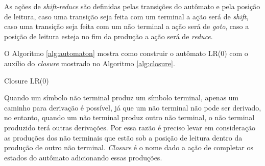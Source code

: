 As ações de \textit{shift-reduce} são definidas pelas transições do autômato e pela posição de leitura, caso uma transição seja feita com um terminal a ação será de \textit{shift}, caso uma transição seja feita com um não terminal a ação será de \textit{goto}, caso a posição de leitura esteja no fim da produção a ação será de \textit{reduce}.

O Algoritmo \ref{alg:automaton} mostra como construir o autômato LR(0) com o auxílio do \textit{closure} mostrado no Algoritmo \ref{alg:closure}.

\begin{algorithm}[ht]
    \caption{Closure LR(0)}\label{alg:closure}
\end{algorithm}

Quando um símbolo não terminal produz um símbolo terminal, apenas um caminho para derivação é possível, já que um não terminal não pode ser derivado, no entanto, quando um não terminal produz outro não terminal, o não terminal produzido terá outras derivações. Por essa razão é preciso levar em consideração as produções dos não terminais que estão sob a posição de leitura dentro da produção de outro não terminal. \textit{Closure} é o nome dado a ação de completar os estados do autômato adicionando essas produções.

